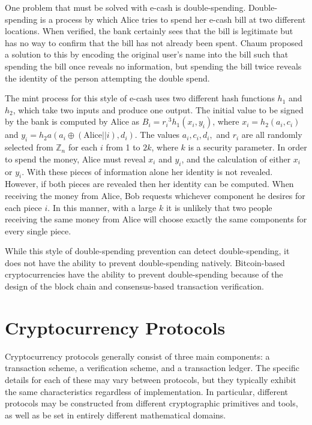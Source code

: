 \documentclass[11pt]{article}
\begin{document}
One problem that must be solved with e-cash is double-spending. Double-spending is a process by which Alice tries to
spend her e-cash bill at two different locations. When verified, the bank certainly sees that the bill is legitimate but
has no way to confirm that the bill has not already been spent. Chaum proposed a solution to this by encoding the
original user's name into the bill such that spending the bill once reveals no information, but spending the bill twice
reveals the identity of the person attempting the double spend.\cite{chaum1990}

The mint process for this style of e-cash uses two different hash functions $h_1$ and $h_2$, which take two inputs and
produce one output. The initial value to be signed by the bank is computed by Alice as $B_i = {r_i}^3h_1(x_i,y_i)$, where
$x_i=h_2(a_i,c_i)$ and $y_i=h_2a(a_i \oplus (\textrm{Alice} || i), d_i)$. The values $a_i, c_i, d_i,$ and $r_i$ are all
randomly selected from $\mathbb{Z}_n$ for each $i$ from 1 to $2k$, where $k$ is a security parameter. In order to spend
the money, Alice must reveal $x_i$ and $y_i$, and the calculation of either $x_i$ or $y_i$. With these pieces of
information alone her identity is not revealed. However, if both pieces are revealed then her identity can be computed.
When receiving the money from Alice, Bob requests whichever component he desires for each piece $i$. In this manner,
with a large $k$ it is unlikely that two people receiving the same money from Alice will choose exactly the same
components for every single piece.

While this style of double-spending prevention can detect double-spending, it does not have the ability to prevent
double-spending natively. Bitcoin-based cryptocurrencies have the ability to prevent double-spending because of the
design of the block chain and consensus-based transaction verification.

\section{Cryptocurrency Protocols}
Cryptocurrency protocols generally consist of three main components: a transaction scheme, a verification scheme, and a
transaction ledger. The specific details for each of these may vary between protocols, but they typically exhibit the
same characteristics regardless of implementation. In particular, different protocols may be constructed from different
cryptographic primitives and tools, as well as be set in entirely different mathematical domains.
\end{document}
